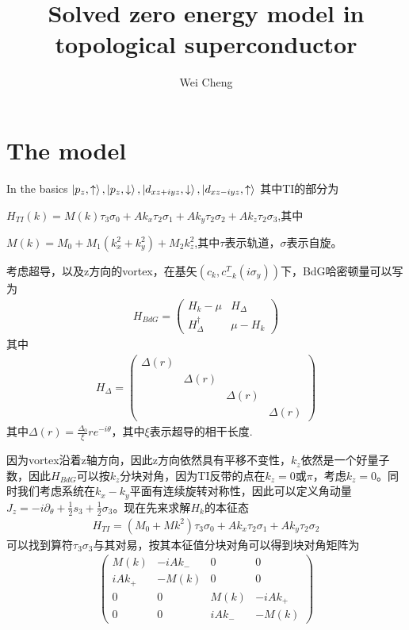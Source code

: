 \documentclass[22pt]{article}
\title{\Huge {\vspace{-2cm}Solved zero energy model in topological superconductor}}
\author{\LARGE {Wei Cheng}}
\date{}
\begin{document}
	\Large
	\maketitle
	\section*{The model}
	In the basics $\ket{p_z,\uparrow},\ket{p_z,\downarrow},\ket{d_{xz+iyz},\downarrow},\ket{d_{xz-iyz},\uparrow}$  其中TI的部分为
	\par 
	$H_{TI}(k)=M(k)\tau_3\sigma_0+Ak_x\tau_2\sigma_1+Ak_y\tau_2\sigma_2+Ak_z\tau_2\sigma_3$,其中
	\par $M(k)=M_0+M_1(k_x^2+k_y^2)+M_2k_z^2$,其中$\tau$表示轨道，$\sigma$表示自旋。
	\par 
	考虑超导，以及z方向的vortex，在基矢$(c_{k},c_{-k}^T(i\sigma_y))$下，BdG哈密顿量可以写为
	\begin{align}
		H_{BdG}=
		\begin{pmatrix}
			H_k-\mu  &  H_{\Delta} \\
			H_{\Delta}^{\dagger} & \mu-H_k
		\end{pmatrix}
	\end{align}
其中
\begin{align}
	H_{\Delta}=
	\begin{pmatrix}
		\Delta(r) &&&\\
		&\Delta(r)&&\\
		&&\Delta(r)&\\
		&&&\Delta(r)
	\end{pmatrix}
\end{align}	
	其中$\Delta(r)=\frac{\Delta_0}{\xi}re^{-i\theta}$，其中$\xi$表示超导的相干长度.
	\par
	因为vortex沿着z轴方向，因此z方向依然具有平移不变性，$k_z$依然是一个好量子数，因此$H_{BdG}$可以按$k_z$分块对角，因为TI反带的点在$k_z=0或\pi$，考虑$k_z=0$。同时我们考虑系统在$k_x-k_y$平面有连续旋转对称性，因此可以定义角动量$J_z=-i\partial_{\theta}+\frac{1}{2}s_3+\frac{1}{2}\sigma_3$。现在先来求解$H_k$的本征态
	\begin{align}
		H_{TI}=(M_0+Mk^2)\tau_3\sigma_0+Ak_x\tau_2\sigma_1+Ak_y\tau_2\sigma_2
	\end{align}
可以找到算符$\tau_3\sigma_3$与其对易，按其本征值分块对角可以得到块对角矩阵为
\begin{align}
	\begin{pmatrix}
		     M(k)     &  -iAk_{-}  &0 &0 \\
		     iAk_{+}  & -M(k) &0&0 \\
		     0&0& M(k) &   -iAk_{+} \\
		     0&0&iAk_{-} &-M(k)
	\end{pmatrix}
\end{align}
\end{document}
